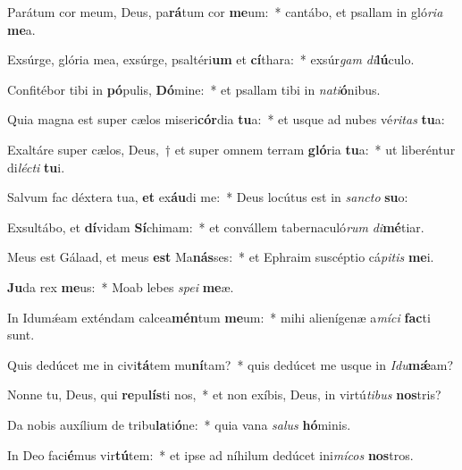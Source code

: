 \item Parátum cor meum, Deus, pa\textbf{rá}tum cor \textbf{me}um:~* cantábo, et psallam in gló\textit{ri}\textit{a} \textbf{me}a.
\item Exsúrge, glória mea, exsúrge, psaltéri\textbf{um} et \textbf{cí}thara:~* exsúr\textit{gam} \textit{di}\textbf{lú}culo.
\item Confitébor tibi in \textbf{pó}pulis, \textbf{Dó}mine:~* et psallam tibi in \textit{na}\textit{ti}\textbf{ó}nibus.
\item Quia magna est super cælos miseri\textbf{cór}dia \textbf{tu}a:~* et usque ad nubes vé\textit{ri}\textit{tas} \textbf{tu}a:
\item Exaltáre super cælos, Deus,~† et super omnem terram \textbf{gló}ria \textbf{tu}a:~* ut liberéntur di\textit{léc}\textit{ti} \textbf{tu}i.
\item Salvum fac déxtera tua, \textbf{et} ex\textbf{áu}di me:~* Deus locútus est in \textit{sanc}\textit{to} \textbf{su}o:
\item Exsultábo, et \textbf{dí}vidam \textbf{Sí}chimam:~* et convállem tabernaculó\textit{rum} \textit{di}\textbf{mé}tiar.
\item Meus est Gálaad, et meus \textbf{est} Ma\textbf{nás}ses:~* et Ephraim suscéptio cá\textit{pi}\textit{tis} \textbf{me}i.
\item \textbf{Ju}da rex \textbf{me}us:~* Moab lebes \textit{spe}\textit{i} \textbf{me}æ.
\item In Idumǽam exténdam calcea\textbf{mén}tum \textbf{me}um:~* mihi alienígenæ a\textit{mí}\textit{ci} \textbf{fac}ti sunt.
\item Quis dedúcet me in civi\textbf{tá}tem mu\textbf{ní}tam?~* quis dedúcet me usque in \textit{I}\textit{du}\textbf{mǽ}am?
\item Nonne tu, Deus, qui \textbf{re}pu\textbf{lís}ti nos,~* et non exíbis, Deus, in virtú\textit{ti}\textit{bus} \textbf{nos}tris?
\item Da nobis auxílium de tribu\textbf{la}ti\textbf{ó}ne:~* quia vana \textit{sa}\textit{lus} \textbf{hó}minis.
\item In Deo faci\textbf{é}mus vir\textbf{tú}tem:~* et ipse ad níhilum dedúcet ini\textit{mí}\textit{cos} \textbf{nos}tros.

